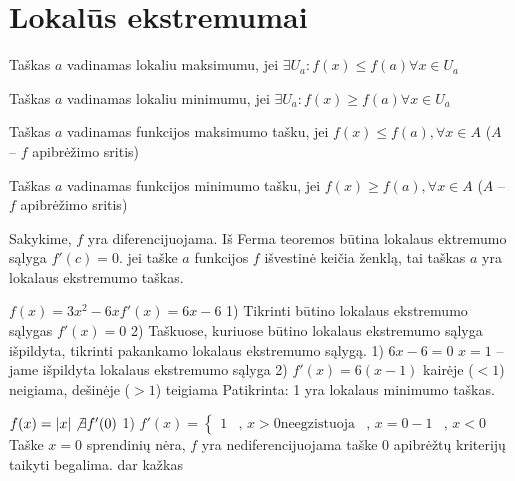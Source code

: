 \chapter{Lokalūs ekstremumai}
\begin{defn}
  Taškas $a$ vadinamas lokaliu maksimumu, jei
  $\exists U_a : f(x) \leq f(a) \forall x \in U_a$
\end{defn}
\begin{defn}
  Taškas $a$ vadinamas lokaliu minimumu, jei
  $\exists U_a : f(x) \geq f(a) \forall x \in U_a$
\end{defn}
\begin{defn}
  Taškas $a$ vadinamas funkcijos maksimumo tašku, jei
  $f(x) \leq f(a), \forall x \in A$ ($A$ – $f$ apibrėžimo sritis)
\end{defn}
\begin{defn}
  Taškas $a$ vadinamas funkcijos minimumo tašku, jei
  $f(x) \geq f(a), \forall x \in A$ ($A$ – $f$ apibrėžimo sritis)
\end{defn}
Sakykime, $f$ yra diferencijuojama. Iš Ferma teoremos \implies būtina
lokalaus ektremumo sąlyga $f'(c) = 0$.
\grafikai \implies jei taške $a$ funkcijos $f$ išvestinė keičia ženklą, tai
taškas $a$ yra lokalaus ekstremumo taškas.

\begin{exmp}
  $f(x) = 3x^2 - 6x
  f'(x) = 6x - 6$
  1) Tikrinti būtino lokalaus ekstremumo sąlygas
  $f'(x) = 0$
  2) Taškuose, kuriuose būtino lokalaus ekstremumo sąlyga išpildyta,
  tikrinti pakankamo lokalaus ekstremumo sąlygą.
  1) $6x - 6 = 0$
     $x = 1$ – jame išpildyta lokalaus ekstremumo sąlyga
  2) $f'(x) = 6(x - 1)$ kairėje ($< 1$) neigiama, dešinėje ($> 1$) teigiama
  Patikrinta: 1 yra lokalaus minimumo taškas.
\end{exmp}
\begin{exmp}
  $f(x) = |x|
  \not \exists f'(0)$
  1) $f'(x) = 
      \begin{cases}
        1 & \text{, } x > 0
        \text{neegzistuoja} & \text{, } x = 0
        -1 & \text{, } x < 0
      \end{cases}
     $
     Taške $x = 0$ sprendinių nėra, $f$ yra nediferencijuojama
     \implies taške $0$ apibrėžtų kriterijų taikyti begalima.
  dar kažkas
\end{exmp}
